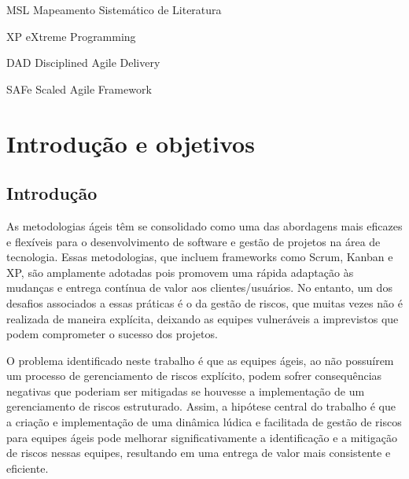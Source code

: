 \documentclass[
	12pt,
	openright,
	twoside,
	a4paper,
	english,
	brazil
	]{abntex2}
\begin{document}

\begin{siglas}
  \item[MSL] Mapeamento Sistemático de Literatura
  \item[XP] eXtreme Programming
  \item[DAD] Disciplined Agile Delivery 
  \item[SAFe] Scaled Agile Framework
\end{siglas}


\tableofcontents*
\cleardoublepage
\textual


\chapter{Introdução e objetivos} %

\section{Introdução}
As metodologias ágeis têm se consolidado como uma das abordagens mais eficazes e flexíveis para o desenvolvimento de software e gestão de projetos na área de tecnologia. Essas metodologias, que incluem frameworks como Scrum, Kanban e XP, são amplamente adotadas pois promovem uma rápida adaptação às mudanças e entrega contínua de valor aos clientes/usuários. No entanto, um dos desafios associados a essas práticas é o da gestão de riscos, que muitas vezes não é realizada de maneira explícita, deixando as equipes vulneráveis a imprevistos que podem comprometer o sucesso dos projetos.

O problema identificado neste trabalho é que as equipes ágeis, ao não possuírem um processo de gerenciamento de riscos explícito, podem sofrer consequências negativas que poderiam ser mitigadas se houvesse a implementação de um gerenciamento de riscos estruturado. Assim, a hipótese central do trabalho é que a criação e implementação de uma dinâmica lúdica e facilitada de gestão de riscos para equipes ágeis pode melhorar significativamente a identificação e a mitigação de riscos nessas equipes, resultando em uma entrega de valor mais consistente e eficiente. 
\end{document}
